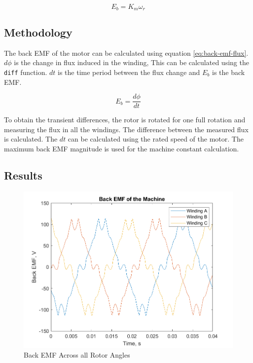 \documentclass[12pt]{article}
\begin{document}
\begin{equation}\label{eq:back-emf}
    E_{b} = K_{m} \omega_{r}
\end{equation}

\subsection{Methodology}

The back EMF of the motor can be calculated using equation \ref{eq:back-emf-flux}. $d\phi$ is the change in flux induced in the winding, This can be calculated using the \lstinline{diff} function. $dt$ is the time period between the flux change and $E_{b}$ is the back EMF.

\begin{equation}\label{eq:back-emf-flux}
    E_{b} = \frac{d\phi}{dt}
\end{equation}

To obtain the transient differences, the rotor is rotated for one full rotation and measuring the flux in all the windings. The difference between the measured flux is calculated. The $dt$ can be calculated using the rated speed of the motor. The maximum back EMF magnitude is used for the machine constant calculation.

\subsection{Results}

\begin{figure}[H]
    \centering
    \includegraphics[width=1\linewidth]{img/task_2_1.png}
    \caption{Back EMF Across all Rotor Angles}
    \label{fig:task-2}
\end{figure}
\end{document}
